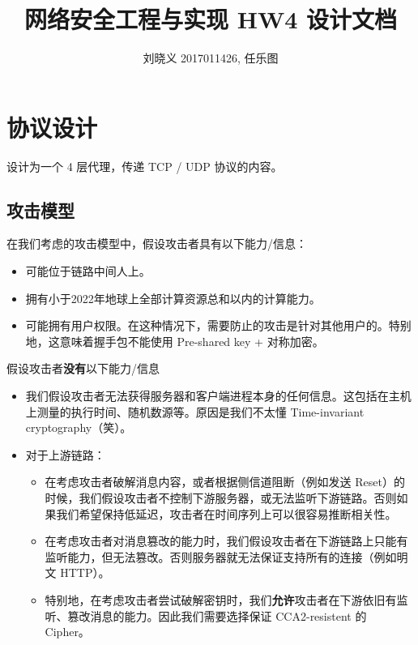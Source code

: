 \documentclass{ctexart}
\title{网络安全工程与实现 HW4 设计文档}
\author{刘晓义 2017011426, 任乐图}
\begin{document}
  \maketitle

  \tableofcontents

  \section{协议设计}

  设计为一个 4 层代理，传递 TCP / UDP 协议的内容。

  \subsection{攻击模型}

  在我们考虑的攻击模型中，假设攻击者具有以下能力/信息：

  \begin{itemize}
    \item 可能位于链路中间人上。
    \item 拥有小于2022年地球上全部计算资源总和以内的计算能力。
    \item 可能拥有用户权限。在这种情况下，需要防止的攻击是针对其他用户的。特别地，这意味着握手包不能使用 Pre-shared key + 对称加密。
  \end{itemize}

  假设攻击者\textbf{没有}以下能力/信息
  \begin{itemize}
    \item 我们假设攻击者无法获得服务器和客户端进程本身的任何信息。这包括在主机上测量的执行时间、随机数源等。原因是我们不太懂 Time-invariant cryptography（笑）。
    \item 对于上游链路：
    \begin{itemize}
      \item 在考虑攻击者破解消息内容，或者根据侧信道阻断（例如发送 Reset）的时候，我们假设攻击者不控制下游服务器，或无法监听下游链路。否则如果我们希望保持低延迟，攻击者在时间序列上可以很容易推断相关性。
      \item 在考虑攻击者对消息篡改的能力时，我们假设攻击者在下游链路上只能有监听能力，但无法篡改。否则服务器就无法保证支持所有的连接（例如明文 HTTP）。
      \item 特别地，在考虑攻击者尝试破解密钥时，我们\textbf{允许}攻击者在下游依旧有监听、篡改消息的能力。因此我们需要选择保证 CCA2-resistent 的 Cipher。
    \end{itemize}
  \end{itemize}
\end{document}
